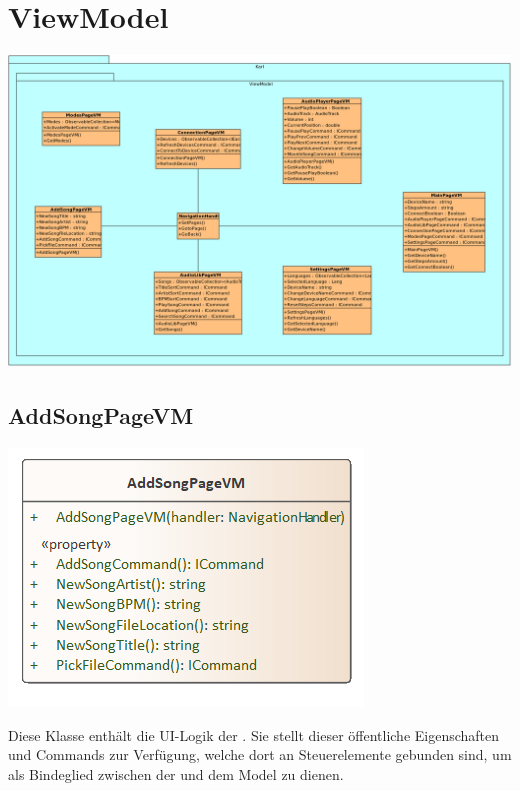 \documentclass[../entwurf.tex]{subfiles}
\begin{document}
\section{ViewModel}
\includegraphics[scale=0.44,angle=90,origin=c]{../graphics/uml_diagramme/ViewModelDiagram.png}
\subsection{AddSongPageVM}
\begin{minipage}{0.45\textwidth}
\includegraphics[scale=0.75]{../graphics/vm_klassen/AddSongPageVM.png}
\end{minipage}
\begin{minipage}{0.55\textwidth}
 \newline
Diese Klasse enthält die UI-Logik der . Sie stellt dieser öffentliche Eigenschaften und Commands zur Verfügung, welche dort an Steuerelemente gebunden sind, um als Bindeglied zwischen der  und dem Model zu dienen.
\end{minipage}
\end{document}
